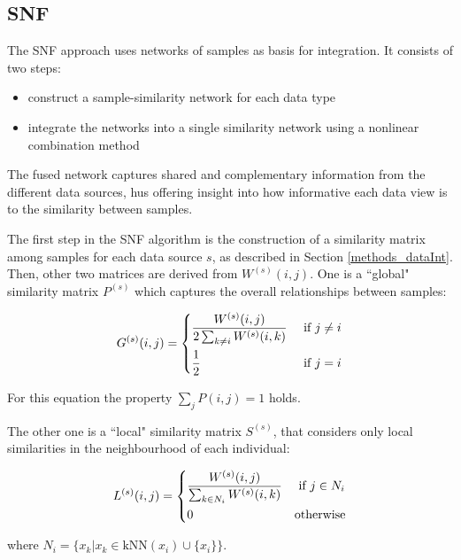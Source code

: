 \subsection{SNF} \label{dataInt_SNF}
The SNF\cite{wang2014similarity} approach uses networks of samples as basis for integration. It consists of two steps:
\begin{itemize}
    \item construct a sample-similarity network for each data type
    \item integrate the networks into a single similarity network using a nonlinear combination method
\end{itemize}
The fused network captures shared and complementary information from the different data sources, hus offering insight into how informative each data view is to the similarity between samples.

The first step in the SNF algorithm is the construction of a similarity matrix among samples for each data source $s$, as described in Section \ref{methods_dataInt}. Then, other two matrices are derived from $W^{(s)}(i,j)$. One is a ``global" similarity matrix $P^{(s)}$ which captures the overall relationships between samples:

\begin{equation*}
    G^{(s)}(i,j) = 
    \begin{dcases}
        \frac{W^{(s)}(i,j)}{2 \sum_{k \neq i} W^{(s)}(i,k)} & \text{ if $j \neq i$}\\
        \frac{1}{2} & \text{ if $j = i$}\\
    \end{dcases}       
\end{equation*}


For this equation the property $\sum_{j} P(i,j)=1$ holds.

The other one is a ``local" similarity matrix $S^{(s)}$, that considers only local similarities in the neighbourhood of each individual:

\begin{equation*}
    L^{(s)}(i,j) = 
    \begin{dcases}
      \frac{W^{(s)}(i,j)}{\sum_{k \in N_i} W^{(s)}(i,k)} & \text{ if $j \in N_i$}\\
      0 & \text{otherwise}\\
    \end{dcases}       
\end{equation*}

where $N_i = \{ x_k | x_k \in \text{kNN}(x_i) \cup \{ x_i \}\}$. \newline


